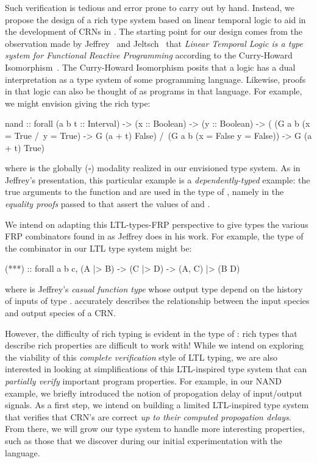 Such verification is tedious and error prone to carry out by hand.
Instead, we propose the design of a rich type system based on linear temporal logic to aid in the development of CRNs in \reactamole.
The starting point for our design comes from the observation made by Jeffrey~\cite{jeffrey2012} and Jeltsch~\cite{jeltsch:2011:talk} that \emph{Linear Temporal Logic is a type system for Functional Reactive Programming} according to the Curry-Howard Isomorphism~\cite{howard:1980:isomorphism}.
The Curry-Howard Isomorphism posits that a logic has a dual interpretation as a type system of some programming language.
Likewise, proofs in that logic can also be thought of as programs in that language.
For example, we might envision giving  the rich type:
\begin{haskellcode}
nand :: forall (a b t :: Interval) -> (x :: Boolean) -> (y :: Boolean)
          -> (  (G a b (x = True /\ y = True) -> G (a + t) False)
             /\ (G a b (x = False \/ y = False)) -> G (a + t) True)
           \end{haskellcode}
where  is the globally (\( \square \)) modality realized in our envisioned type system.
As in Jeffrey's presentation, this particular example is a \emph{dependently-typed} example: the true arguments to the function  and  are used in the type of , namely in the \emph{equality proofs} passed to  that assert the values of  and .

We intend on adapting this LTL-types-FRP perspective to give types the various FRP combinators found in \reactamole as Jeffrey does in his work.
For example, the type of the combinator \hask{(***)} in our LTL type system might be:
\begin{haskellcode}
(***) :: forall a b c, (A |> B) -> (C |> D) -> (A, C) |> (B D)
\end{haskellcode}
where  is Jeffrey's \emph{casual function type} whose output type  depend on the history of inputs of type .
\hask{|>} accurately describes the relationship between the input species and output species of a CRN.

However, the difficulty of rich typing is evident in the type of : rich types that describe rich properties are difficult to work with!
While we intend on exploring the viability of this \emph{complete verification} style of LTL typing, we are also interested in looking at simplifications of this LTL-inspired type system that can \emph{partially verify} important program properties.
For example, in our NAND example, we briefly introduced the notion of propogation delay of input/output signals.
As a first step, we intend on building a limited LTL-inspired type system that verifies that CRN's are correct \emph{up to their computed propogation delays}.
From there, we will grow our type system to handle more interesting properties, such as those that we discover during our initial experimentation with the language.

